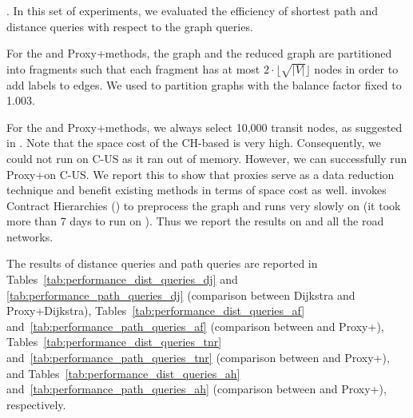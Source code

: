 .
%
In this set of experiments, we evaluated the efficiency of shortest path and distance queries with respect to the graph queries.

For the \arcflag and Proxy+\arcflag methods, the graph and the reduced graph are partitioned into fragments such that each fragment has at most $2\cdot \lfloor\sqrt{|V|}\rfloor$ nodes in order to add labels to edges. We used \metis to partition graphs with the balance factor fixed to 1.003.

For the \tnr and Proxy+\tnr methods, we always select 10,000 transit nodes, as suggested in \cite{arz2013transit}. Note that the space cost of the CH-based \tnr is very high. Consequently, we could not run \tnr on C-US as it ran out of memory. However, we can successfully run Proxy+\tnr on C-US. We report this to show that proxies serve as a data reduction technique and benefit existing methods in terms of space cost as well. \tnr invokes Contract Hierarchies (\ch) \cite{GeisbergerSSD08} to preprocess the graph and \ch runs very slowly on \dblp (it took more than 7 days to run \ch on \dblp). Thus we report the results on \dblpone and all the road networks.

The results of distance queries and path queries are reported in Tables~\ref{tab:performance_dist_queries_dj} and \ref{tab:performance_path_queries_dj} (comparison between Dijkstra and Proxy+Dijkstra), Tables~\ref{tab:performance_dist_queries_af} and~\ref{tab:performance_path_queries_af} (comparison between \arcflag and Proxy+\arcflag), Tables~\ref{tab:performance_dist_queries_tnr} and~\ref{tab:performance_path_queries_tnr} (comparison between \tnr and Proxy+\tnr), and Tables~\ref{tab:performance_dist_queries_ah} and~\ref{tab:performance_path_queries_ah} (comparison between \ah and Proxy+\ah), respectively.

